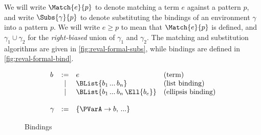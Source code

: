 We will write $\Match{e}{p}$ to denote matching a term $e$ against a
pattern $p$, and write $\Subs{\gamma}{p}$ to denote substituting the
bindings of an environment $\gamma$ into a pattern $p$.  We will write
$e \geq p$ to mean that $\Match{e}{p}$ is defined, and $\gamma_1 \cup
\gamma_2$ for the \emph{right-biased} union of $\gamma_1$ and
$\gamma_2$. The matching and substitution algorithms are given in
\cref{fig:reval-formal-subs}, while bindings are defined in
\cref{fig:reval-formal-bind}.

\begin{figure}[t]
\[\begin{array}{lcll}
b &:=& e                &\text{(term)} \\
  &|&  \BList{b_1\,...\,b_n}  &\text{(list binding)} \\
  &|&  \BList{b_1\,...\,b_n\,\Ell{b_e}} &\text{(ellipsis binding)} \\ \\
\gamma &:=& \{\PVarA \to b,\,...\} \\
\end{array}\]
\caption{Bindings}
\label{fig:formal-bind}
\end{figure}

